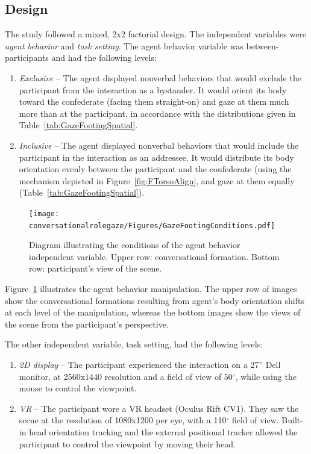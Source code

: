 \subsection{Design}

The study followed a mixed, 2x2 factorial design. The independent variables were \emph{agent behavior} and \emph{task setting}. The agent behavior variable was between-participants and had the following levels:

\begin{enumerate}
\item \emph{Exclusive} -- The agent displayed nonverbal behaviors that would exclude the participant from the interaction as a bystander. It would orient its body toward the confederate (facing them straight-on) and gaze at them much more than at the participant, in accordance with the distributions given in Table~\ref{tab:GazeFootingSpatial}.
\item \emph{Inclusive} -- The agent displayed nonverbal behaviors that would include the participant in the interaction as an addressee. It would distribute its body orientation evenly between the participant and the confederate (using the mechanism depicted in Figure~\ref{fig:FTorsoAlign}, and gaze at them equally (Table~\ref{tab:GazeFootingSpatial}).
\end{enumerate}

\begin{figure}
\centering
\texttt{[image: conversationalrolegaze/Figures/GazeFootingConditions.pdf]}
\caption{Diagram illustrating the conditions of the agent behavior independent variable. Upper row: conversational formation. Bottom row: participant's view of the scene.}
\label{fig:GazeFootingConditions}
\end{figure}

Figure~\ref{fig:GazeFootingConditions} illustrates the agent behavior manipulation. The upper row of images show the conversational formations resulting from agent's body orientation shifts at each level of the manipulation, whereas the bottom images show the views of the scene from the participant's perspective.

The other independent variable, task setting, had the following levels:

\begin{enumerate}
\item \emph{2D display} -- The participant experienced the interaction on a 27'' Dell monitor, at 2560x1440 resolution and a field of view of 50$^\circ$, while using the mouse to control the viewpoint.
\item \emph{VR} -- The participant wore a VR headset (Oculus Rift CV1). They saw the scene at the resolution of 1080x1200 per eye, with a 110$^\circ$ field of view. Built-in head orientation tracking and the external positional tracker allowed the participant to control the viewpoint by moving their head.
\end{enumerate}

